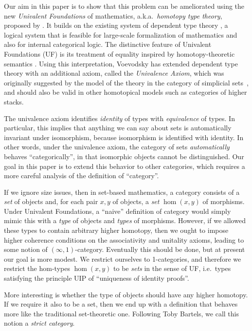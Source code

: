 \documentclass{mscs}
\numberwithin{equation}{section}
\begin{document}
Our aim in this paper is to show that this problem can be ameliorated using the new \emph{Univalent Foundations} of mathematics, a.k.a.\ \emph{homotopy type theory}, proposed by \textcite{vv_uf}.
It builds on the existing system of dependent type theory \parencite{martin-lof:bibliopolis, werner:thesis}, a logical system that is feasible for large-scale formalization of mathematics \parencite{gonthier:feit-thompson} and also for internal categorical logic.
The distinctive feature of Univalent Foundations (UF) is its treatment of equality inspired by homotopy-theoretic semantics \parencite{awodey-warren, arndt-kapulkin, warren:thesis, garner-van-den-berg:top-and-simp-models}.
Using this interpretation, Voevodsky has extended dependent type theory with an additional axiom, called the \emph{Univalence Axiom}, which was originally suggested by the model of the theory in the category of simplicial sets~\parencite{klv:ssetmodel}, and should also be valid in other homotopical models such as categories of higher stacks.

The univalence axiom identifies \emph{identity} of types with \emph{equivalence} of types.
In particular, this implies that anything we can say about sets is automatically invariant under isomorphism, because isomorphism is identified with identity.
In other words, under the univalence axiom, the category of sets \emph{automatically} behaves ``categorically'', in that isomorphic objects cannot be distinguished.
Our goal in this paper is to extend this behavior to other categories, which requires a more careful analysis of the definition of ``category''.

If we ignore size issues, then in set-based mathematics, a category consists of a \emph{set} of objects and, for each pair $x,y$ of objects, a \emph{set} $\hom(x,y)$ of morphisms.
Under Univalent Foundations, a ``naive'' definition of category would simply mimic this with a \emph{type} of objects and \emph{types} of morphisms.
However, if we allowed these types to contain arbitrary higher homotopy, then we ought to impose higher coherence conditions on the associativity and unitality axioms, leading to some notion of $(\infty,1)$-category.
Eventually this should be done, but at present our goal is more modest.
We restrict ourselves to 1-categories, and therefore we restrict the hom-types $\hom(x,y)$ to be \emph{sets} in the sense of UF, i.e.\ types satisfying the principle UIP of ``uniqueness of identity proofs''.

More interesting is whether the type of objects should have any higher homotopy.
If we require it also to be a set, then we end up with a definition that behaves more like the traditional set-theoretic one.
Following Toby Bartels, we call this notion a \emph{strict category}.
\end{document}
